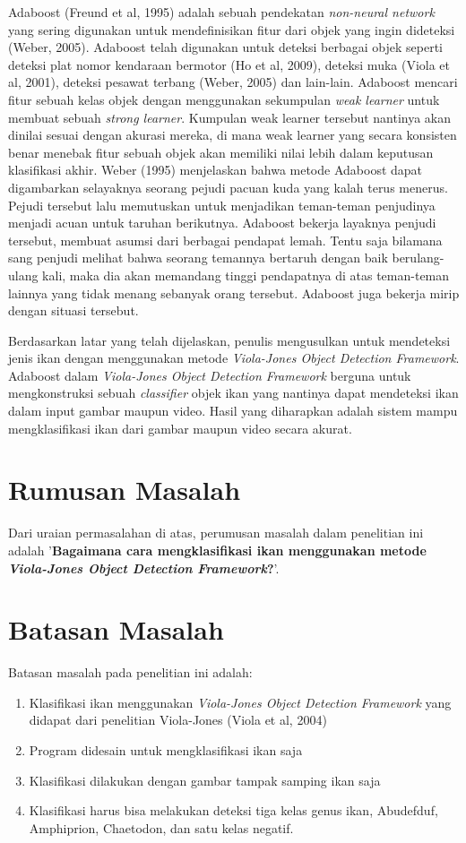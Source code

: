 Adaboost (Freund et al, 1995) adalah sebuah pendekatan \textit{non-neural network} 
yang sering digunakan untuk mendefinisikan fitur dari objek yang ingin 
dideteksi (Weber, 2005). Adaboost telah digunakan untuk deteksi berbagai objek 
seperti deteksi plat nomor kendaraan bermotor (Ho et al, 2009), deteksi muka 
(Viola et al, 2001), deteksi pesawat terbang (Weber, 2005) dan lain-lain. 
Adaboost mencari fitur sebuah kelas objek dengan menggunakan sekumpulan 
\emph{weak learner} untuk membuat sebuah \emph{strong learner}. 
Kumpulan weak learner tersebut nantinya akan dinilai sesuai dengan akurasi 
mereka, di mana weak learner yang secara konsisten benar menebak fitur sebuah 
objek akan memiliki nilai lebih dalam keputusan klasifikasi akhir. Weber (1995) 
menjelaskan bahwa metode Adaboost dapat digambarkan selayaknya seorang pejudi 
pacuan kuda yang kalah terus menerus. Pejudi tersebut lalu memutuskan untuk 
menjadikan teman-teman penjudinya menjadi acuan untuk taruhan berikutnya. 
Adaboost bekerja layaknya penjudi tersebut, membuat asumsi dari berbagai 
pendapat lemah. Tentu saja bilamana sang penjudi melihat bahwa seorang 
temannya bertaruh dengan baik berulang-ulang kali, maka dia akan 
memandang tinggi pendapatnya di atas teman-teman lainnya yang tidak menang 
sebanyak orang tersebut. Adaboost juga bekerja mirip dengan situasi tersebut.

Berdasarkan latar yang telah dijelaskan, penulis mengusulkan untuk mendeteksi 
jenis ikan dengan menggunakan metode \emph{Viola-Jones Object Detection Framework}. 
Adaboost dalam \emph{Viola-Jones Object Detection Framework} berguna untuk 
mengkonstruksi sebuah \emph{classifier} objek ikan yang nantinya dapat mendeteksi 
ikan dalam input gambar maupun video. Hasil yang diharapkan adalah sistem 
mampu mengklasifikasi ikan dari gambar maupun video secara akurat.

\section{Rumusan Masalah}
Dari uraian permasalahan di atas, perumusan masalah dalam penelitian ini adalah 
'\textbf{Bagaimana cara mengklasifikasi ikan menggunakan metode 
\textit{Viola-Jones Object Detection Framework}?}'.

\section{Batasan Masalah}
Batasan masalah pada penelitian ini adalah:
\begin{enumerate}
	\item Klasifikasi ikan menggunakan \textit{Viola-Jones Object Detection Framework} yang didapat dari penelitian Viola-Jones (Viola et al, 2004)
	\item Program didesain untuk mengklasifikasi ikan saja
	\item Klasifikasi dilakukan dengan gambar tampak samping ikan saja
	\item Klasifikasi harus bisa melakukan deteksi tiga kelas genus ikan, Abudefduf, Amphiprion, Chaetodon, 
	dan satu kelas negatif.
\end{enumerate}

